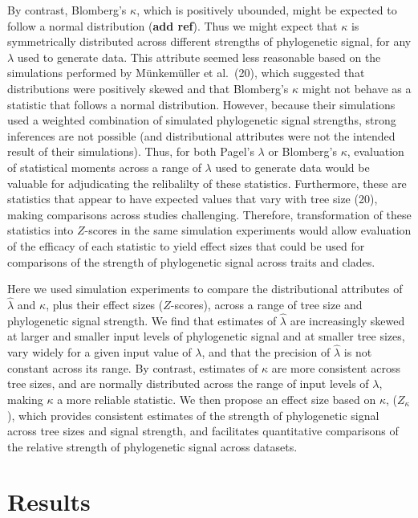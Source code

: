 \documentclass[9pt,twocolumn,twoside,lineno]{pnas-new}
\begin{document}
By contrast, Blomberg's \(\kappa\), which is positively ubounded, might
be expected to follow a normal distribution (\textbf{add ref}). Thus we
might expect that \(\kappa\) is symmetrically distributed across
different strengths of phylogenetic signal, for any \(\lambda\) used to
generate data. This attribute seemed less reasonable based on the
simulations performed by Münkemüller et al.~(20), which suggested that
distributions were positively skewed and that Blomberg's \(\kappa\)
might not behave as a statistic that follows a normal distribution.
However, because their simulations used a weighted combination of
simulated phylogenetic signal strengths, strong inferences are not
possible (and distributional attributes were not the intended result of
their simulations). Thus, for both Pagel's \(\lambda\) or Blomberg's
\(\kappa\), evaluation of statistical moments across a range of
\(\lambda\) used to generate data would be valuable for adjudicating the
relibalilty of these statistics. Furthermore, these are statistics that
appear to have expected values that vary with tree size (20), making
comparisons across studies challenging. Therefore, transformation of
these statistics into \(Z\)-scores in the same simulation experiments
would allow evaluation of the efficacy of each statistic to yield effect
sizes that could be used for comparisons of the strength of phylogenetic
signal across traits and clades.

Here we used simulation experiments to compare the distributional
attributes of \(\hat{\lambda}\) and \(\kappa\), plus their effect sizes
(\(Z\)-scores), across a range of tree size and phylogenetic signal
strength. We find that estimates of \(\hat{\lambda}\) are increasingly
skewed at larger and smaller input levels of phylogenetic signal and at
smaller tree sizes, vary widely for a given input value of \(\lambda\),
and that the precision of \(\hat{\lambda}\) is not constant across its
range. By contrast, estimates of \(\kappa\) are more consistent across
tree sizes, and are normally distributed across the range of input
levels of \(\lambda\), making \(\kappa\) a more reliable statistic. We
then propose an effect size based on \(\kappa\), (\(Z_{\kappa}\)), which
provides consistent estimates of the strength of phylogenetic signal
across tree sizes and signal strength, and facilitates quantitative
comparisons of the relative strength of phylogenetic signal across
datasets.

\hypertarget{results}{%
\section{Results}\label{results}}
\end{document}
